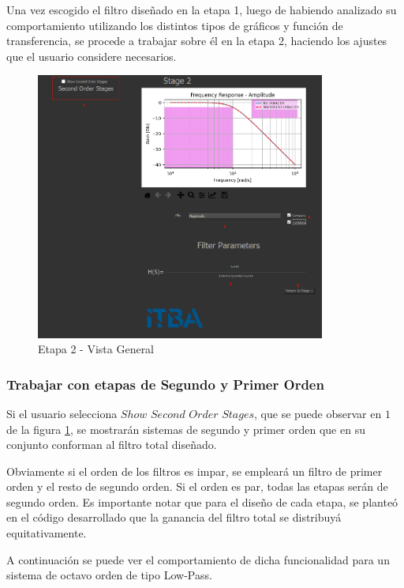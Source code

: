 Una vez escogido el filtro diseñado en la etapa 1, luego de habiendo analizado su comportamiento utilizando los distintos
tipos de gráficos y función de transferencia, se procede a trabajar sobre él en la etapa 2, haciendo los ajustes que el usuario considere necesarios.

\begin{figure}[H]
    \centering
    \includegraphics[width=0.85\textwidth]{../Ejercicio1-FilterTool/Imagenes/con-plantilla.png}
    \caption{Etapa 2 - Vista General}
    \label{Etapa2}
\end{figure}

\subsubsection{Trabajar con etapas de Segundo y Primer Orden}

Si el usuario selecciona $Show$ $Second$ $Order$ $Stages$, que se puede observar en $1$
de la figura \ref{Etapa2}, se mostrarán sistemas de segundo y primer orden que en su conjunto
conforman al filtro total diseñado.

Obviamente si el orden de los filtros es impar, se empleará un filtro de primer orden y el resto de segundo orden.
Si el orden es par, todas las etapas serán de segundo orden. Es importante notar que para el diseño de cada etapa,
se planteó en el código desarrollado que la ganancia del filtro total se distribuyá equitativamente.

A continuación se puede ver el comportamiento de dicha funcionalidad para un sistema de octavo orden de tipo Low-Pass.

